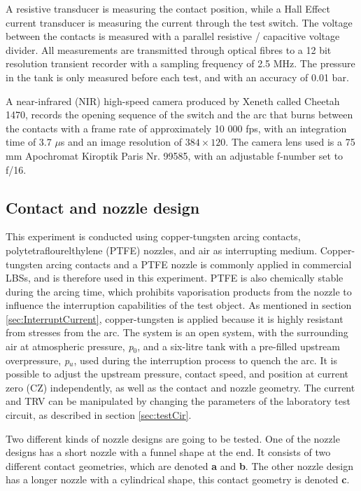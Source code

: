 \documentclass[10pt,b5paper,twoside]{article}
\begin{document}
A resistive transducer is measuring the contact position, while a Hall Effect current transducer is measuring the current through the test switch. The voltage between the contacts is measured with a parallel resistive / capacitive voltage divider. All measurements are transmitted through optical fibres to a 12 bit resolution transient recorder with a sampling frequency of 2.5 MHz. The pressure in the tank is only measured before each test, and with an accuracy of 0.01 bar. 

A near-infrared (NIR) high-speed camera produced by Xeneth called Cheetah 1470, records the opening sequence of the switch and the arc that burns between the contacts with a frame rate of approximately 10 000 fps, with an integration time of 3.7 $\mu$s and an image resolution of $384 \times 120$. The camera lens used is a 75 mm Apochromat Kiroptik Paris Nr. 99585, with an adjustable f-number set to f/16. %

\subsection{Contact and nozzle design} \label{sec:testSwitchandContact}
This experiment is conducted using copper-tungsten arcing contacts, polytetraflourelthylene (PTFE) nozzles, and air as interrupting medium. Copper-tungsten arcing contacts and a PTFE nozzle is commonly applied in commercial LBSs, and is therefore used in this experiment. PTFE is also chemically stable during the arcing time, which prohibits vaporisation products from the nozzle to influence the interruption capabilities of the test object. As mentioned in section \ref{sec:InterruptCurrent}, copper-tungsten is applied because it is highly resistant from stresses from the arc. The system is an open system, with the surrounding air at atmospheric pressure, \textit{p$_0$}, and a six-litre tank with a pre-filled upstream overpressure, \textit{p$_u$}, used during the interruption process to quench the arc. It is possible to adjust the upstream pressure, contact speed, and position at current zero (CZ) independently, as well as the contact and nozzle geometry. The current and TRV can be manipulated by changing the parameters of the laboratory test circuit, as described in section \ref{sec:testCir}.

Two different kinds of nozzle designs are going to be tested. One of the nozzle designs has a short nozzle with a funnel shape at the end. It consists of two different contact geometries, which are denoted \textbf{a} and \textbf{b}. The other nozzle design has a longer nozzle with a cylindrical shape, this contact geometry is denoted \textbf{c}. 
\end{document}
